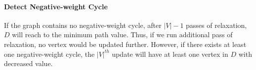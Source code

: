 \documentclass[../main.tex]{subfiles}
\begin{document}
\paragraph{Detect Negative-weight Cycle} 
If the graph contains no negative-weight cycle, after $|V|-1$ passes of relaxation, $D$ will reach to the minimum path value. Thus, if we run additional pass of relaxation, no vertex would be updated further. However, if there exists at least one negative-weight cycle, the $|V|^{th}$ update will have at least one vertex in $D$ with decreased value. 
\end{document}
